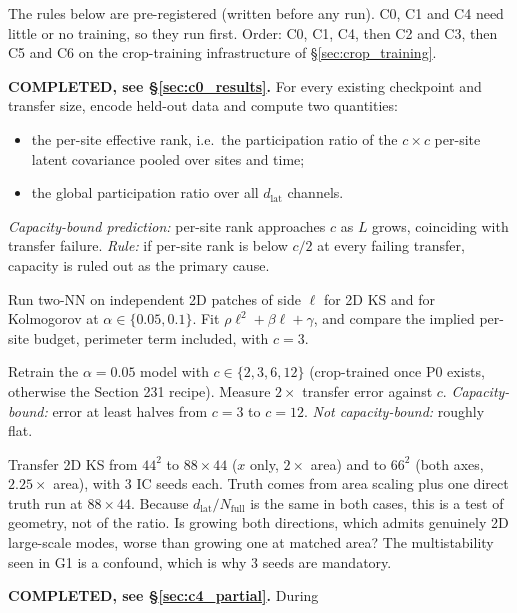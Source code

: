 \documentclass[11pt]{article}
\begin{document}
The rules below are pre-registered (written before any run). C0, C1 and
C4 need little or no training, so they run first. Order: C0, C1, C4, then
C2 and C3, then C5 and C6 on the crop-training infrastructure of
\S\ref{sec:crop_training}.
\begin{description}[leftmargin=*]
\item[C0 --- capacity audit, no training.] \textbf{COMPLETED, see \S\ref{sec:c0_results}.} For every existing checkpoint
  and transfer size, encode held-out data and compute two quantities:
  \begin{itemize}[leftmargin=*]
  \item the per-site effective rank, i.e.\ the participation ratio of the
    $c{\times}c$ per-site latent covariance pooled over sites and time;
  \item the global participation ratio over all $d_{\mathrm{lat}}$
    channels.
  \end{itemize}
  \emph{Capacity-bound prediction:} per-site rank approaches $c$ as $L$
  grows, coinciding with transfer failure. \emph{Rule:} if per-site rank
  is below $c/2$ at every failing transfer, capacity is ruled out as the
  primary cause.
\item[C1 --- 2D local dimension (brief D5 in 2D).] Run two-NN on
  independent 2D patches of side $\ell$ for 2D KS and for Kolmogorov at
  $\alpha\in\{0.05,0.1\}$. Fit $\rho\ell^2+\beta\ell+\gamma$, and compare
  the implied per-site budget, perimeter term included, with $c{=}3$.
\item[C2 --- capacity sweep.] Retrain the $\alpha{=}0.05$ model with
  $c\in\{2,3,6,12\}$ (crop-trained once P0 exists, otherwise the Section
  231 recipe). Measure $2\times$ transfer error against $c$.
  \emph{Capacity-bound:} error at least halves from $c{=}3$ to $c{=}12$.
  \emph{Not capacity-bound:} roughly flat.
\item[C3 --- geometry, the sharpened one-axis test.] Transfer 2D KS from
  $44^2$ to $88\times44$ ($x$ only, $2\times$ area) and to $66^2$ (both
  axes, $2.25\times$ area), with 3 IC seeds each. Truth comes from area
  scaling plus one direct truth run at $88\times44$. Because
  $d_{\mathrm{lat}}/N_{\mathrm{full}}$ is the same in both cases, this is
  a test of geometry, not of the ratio. Is growing both directions, which
  admits genuinely 2D large-scale modes, worse than growing one at matched
  area? The multistability seen in G1 is a confound, which is why 3 seeds
  are mandatory.
\item[C4 --- zero-training fusion, the cheap consensus test.] \textbf{COMPLETED, see \S\ref{sec:c4_partial}.} During

\end{description}
\end{document}
